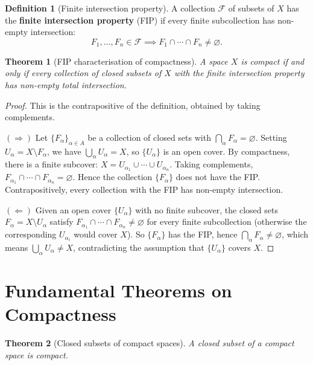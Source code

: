 \documentclass[11pt,a4paper,twoside]{book}
\newtheorem{theorem}{Theorem}[section]
\theoremstyle{remark}
\theoremstyle{definition}
\theoremstyle{definition}
\newtheorem{definition}{Definition}[section]
\begin{document}
\begin{definition}[Finite intersection property]\label{def:FIP}
A collection $\mathcal{F}$ of subsets of $X$ has the \textbf{finite
intersection property} (FIP) if every finite subcollection has non-empty
intersection:
\[
  F_1, \ldots, F_n \in \mathcal{F} \implies
  F_1 \cap \cdots \cap F_n \neq \varnothing.
\]
\end{definition}

\begin{theorem}[FIP characterisation of compactness]
\label{thm:FIP-compactness}
A space $X$ is compact if and only if every collection of closed subsets of
$X$ with the finite intersection property has non-empty total intersection.
\end{theorem}

\begin{proof}
This is the contrapositive of the definition, obtained by taking complements.

$(\Rightarrow)$ Let $\{F_\alpha\}_{\alpha \in A}$ be a collection of closed
sets with $\bigcap_\alpha F_\alpha = \varnothing$.  Setting
$U_\alpha = X \setminus F_\alpha$, we have
$\bigcup_\alpha U_\alpha = X$, so $\{U_\alpha\}$ is an open cover.
By compactness, there is a finite subcover:
$X = U_{\alpha_1} \cup \cdots \cup U_{\alpha_n}$.  Taking complements,
$F_{\alpha_1} \cap \cdots \cap F_{\alpha_n} = \varnothing$.  Hence the
collection $\{F_\alpha\}$ does not have the FIP.  Contrapositively, every
collection with the FIP has non-empty intersection.

$(\Leftarrow)$ Given an open cover $\{U_\alpha\}$ with no finite subcover,
the closed sets $F_\alpha = X \setminus U_\alpha$ satisfy
$F_{\alpha_1} \cap \cdots \cap F_{\alpha_n} \neq \varnothing$ for every
finite subcollection (otherwise the corresponding $U_{\alpha_i}$ would cover
$X$).  So $\{F_\alpha\}$ has the FIP, hence
$\bigcap_\alpha F_\alpha \neq \varnothing$, which means
$\bigcup_\alpha U_\alpha \neq X$, contradicting the assumption that
$\{U_\alpha\}$ covers $X$.
\end{proof}

\section{Fundamental Theorems on Compactness}
\label{sec:compactness-theorems}

\begin{theorem}[Closed subsets of compact spaces]\label{thm:closed-in-compact}
A closed subset of a compact space is compact.
\end{theorem}
\end{document}
